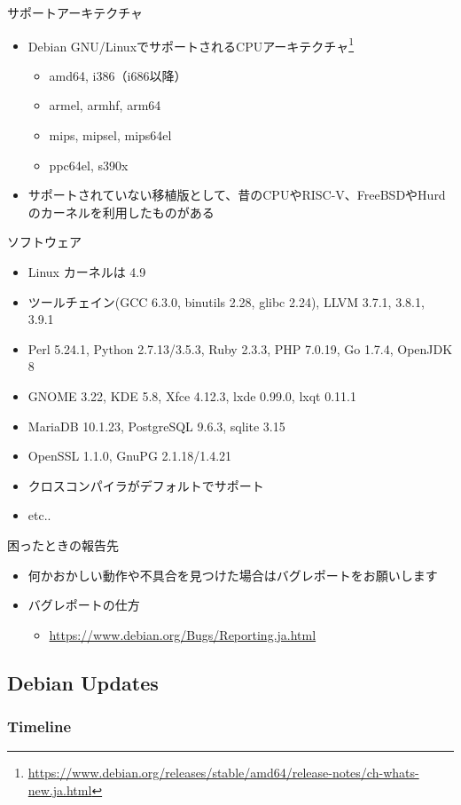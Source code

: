 \documentclass[mingoth,a4paper]{jsarticle}
\begin{document}
サポートアーキテクチャ
\begin{itemize}
\item Debian GNU/LinuxでサポートされるCPUアーキテクチャ\footnote{\url{https://www.debian.org/releases/stable/amd64/release-notes/ch-whats-new.ja.html}}
  \begin{itemize}
  \item amd64, i386（i686以降）
  \item armel, armhf, arm64
  \item mips, mipsel, mips64el
  \item ppc64el, s390x
  \end{itemize}
\item サポートされていない移植版として、昔のCPUやRISC-V、FreeBSDやHurdのカーネルを利用したものがある
\end{itemize}

ソフトウェア
\begin{itemize}
\item Linux カーネルは 4.9
\item ツールチェイン(GCC 6.3.0, binutils 2.28, glibc 2.24), LLVM 3.7.1, 3.8.1, 3.9.1
\item Perl 5.24.1, Python 2.7.13/3.5.3, Ruby 2.3.3, PHP 7.0.19, Go 1.7.4, OpenJDK 8
\item GNOME 3.22, KDE 5.8, Xfce 4.12.3, lxde 0.99.0, lxqt 0.11.1
\item MariaDB 10.1.23, PostgreSQL 9.6.3, sqlite 3.15
\item OpenSSL 1.1.0, GnuPG 2.1.18/1.4.21
\item クロスコンパイラがデフォルトでサポート
\item etc..
\end{itemize}

困ったときの報告先
\begin{itemize}
\item 何かおかしい動作や不具合を見つけた場合はバグレポートをお願いします
\item バグレポートの仕方
  \begin{itemize}
  \item \url{https://www.debian.org/Bugs/Reporting.ja.html}
  \end{itemize}
\end{itemize}


\subsection{Debian Updates}

\subsubsection{Timeline}
\end{document}
